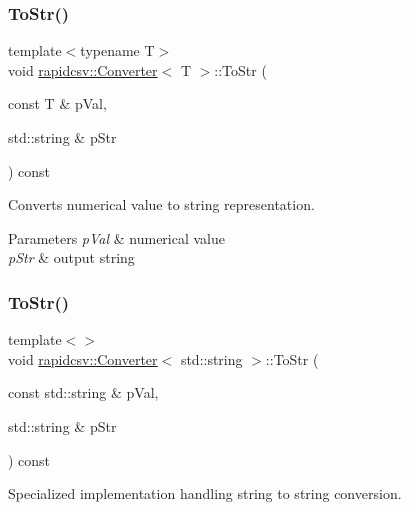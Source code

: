 \subsubsection{\texorpdfstring{To\+Str()}{ToStr()}\hspace{0.1cm}{\footnotesize\ttfamily [1/2]}}
{\footnotesize\ttfamily template$<$typename T$>$ \\
void \hyperlink{classrapidcsv_1_1Converter}{rapidcsv\+::\+Converter}$<$ T $>$\+::To\+Str (\begin{DoxyParamCaption}\item[{const T \&}]{p\+Val,  }\item[{std\+::string \&}]{p\+Str }\end{DoxyParamCaption}) const\hspace{0.3cm}{\ttfamily [inline]}}



Converts numerical value to string representation. 


\begin{DoxyParams}{Parameters}
{\em p\+Val} & numerical value \\
\hline
{\em p\+Str} & output string \\
\hline
\end{DoxyParams}
\mbox{\label{classrapidcsv_1_1Converter_ae3c2d87f4e7cb9d09d4ecdd23419449c}} 
\subsubsection{\texorpdfstring{To\+Str()}{ToStr()}\hspace{0.1cm}{\footnotesize\ttfamily [2/2]}}
{\footnotesize\ttfamily template$<$$>$ \\
void \hyperlink{classrapidcsv_1_1Converter}{rapidcsv\+::\+Converter}$<$ std\+::string $>$\+::To\+Str (\begin{DoxyParamCaption}\item[{const std\+::string \&}]{p\+Val,  }\item[{std\+::string \&}]{p\+Str }\end{DoxyParamCaption}) const\hspace{0.3cm}{\ttfamily [inline]}}



Specialized implementation handling string to string conversion. 


